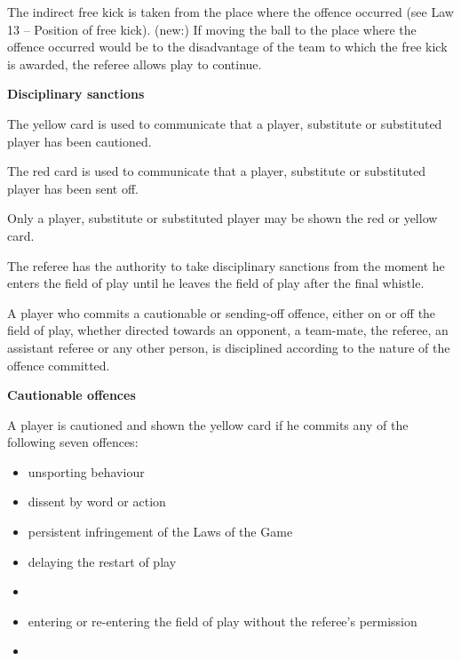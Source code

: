 The indirect free kick is taken from the place where the offence occurred (see Law 13 -- Position of free kick). (new:) If moving the ball to the place where the offence occurred would be to the disadvantage of the team to which the free kick is awarded, the referee allows play to continue.

\bigskip

{\bfseries Disciplinary sanctions}

\headlinebox

The yellow card is used to communicate that a player, substitute or substituted player has been cautioned.
\bigskip

The red card is used to communicate that a player, substitute or substituted player has been sent off.
\bigskip

Only a player, substitute or substituted player may be shown the red or yellow card.

\bigskip

The referee has the authority to take disciplinary sanctions from the moment he enters the field of play until he leaves the field of play after the final whistle. 

\bigskip

A player who commits a cautionable or sending-off offence, either on or off the field of play, whether directed towards an opponent, a team-mate, the referee, an assistant referee or any other person, is disciplined according to the nature of the offence committed.

\bigskip

{\bfseries Cautionable offences }

\headlinebox

A player is cautioned and shown the yellow card if he commits any of the following seven offences: 

\begin{itemize}
\item unsporting behaviour
\item dissent by word or action
\item persistent infringement of the Laws of the Game
\item delaying the restart of play
\item {}
\item entering or re-entering the field of play without the referee's permission
\item {}
\end{itemize}


